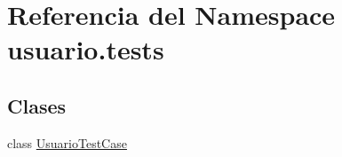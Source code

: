 \hypertarget{namespaceusuario_1_1tests}{}\section{Referencia del Namespace usuario.\+tests}
\label{namespaceusuario_1_1tests}
\subsection*{Clases}
\begin{DoxyCompactItemize}
\item 
class \hyperlink{classusuario_1_1tests_1_1_usuario_test_case}{Usuario\+Test\+Case}
\end{DoxyCompactItemize}
